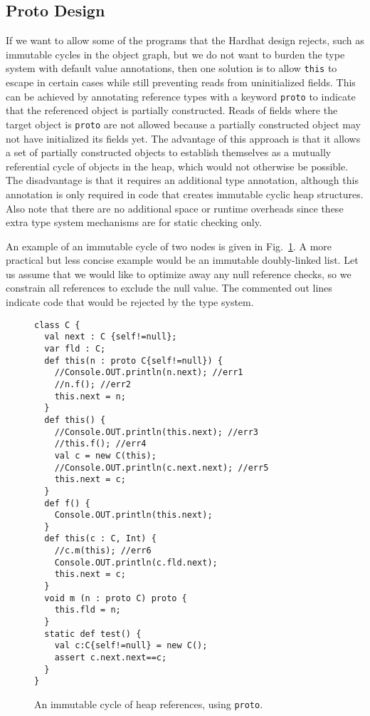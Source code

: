 \subsection{Proto Design}

If we want to allow some of the programs that the Hardhat design rejects, such
as immutable cycles in the object graph, but we do not want to burden the type
system with default value annotations, then one solution is to allow
\texttt{this} to escape in certain cases while still preventing reads from
uninitialized fields.  This can be achieved by annotating reference types with
a keyword \texttt{proto} to indicate that the referenced object is partially
constructed.  Reads of fields where the target object is \texttt{proto}
are not allowed because a partially constructed object may not have
initialized its fields yet.  The advantage of this approach is that it allows a set
of partially constructed objects to establish themselves as a mutually
referential cycle of objects in the heap, which would not otherwise be possible.
The disadvantage is that it requires an additional type annotation, although this
annotation is only required in code that creates immutable cyclic heap
structures.  Also note that there are no additional space or runtime overheads
since these extra type system mechanisms are for static checking only.

An example of an immutable cycle of two nodes is given in
Fig.~\ref{Figure:Cyclic}.  A more practical but less concise example would be an
immutable doubly-linked list.  Let us assume that we would like to optimize
away any null reference checks, so we constrain all references to exclude the
null value.  The commented out lines indicate code that would be rejected by
the type system.

\begin{figure}
\vspace{-0.2cm}\begin{lstlisting}
class C {
  val next : C {self!=null};
  var fld : C;
  def this(n : proto C{self!=null}) {
    //Console.OUT.println(n.next); //err1
    //n.f(); //err2
    this.next = n;
  }
  def this() {
    //Console.OUT.println(this.next); //err3
    //this.f(); //err4
    val c = new C(this);
    //Console.OUT.println(c.next.next); //err5
    this.next = c;
  }
  def f() {
    Console.OUT.println(this.next);
  }
  def this(c : C, Int) {
    //c.m(this); //err6
    Console.OUT.println(c.fld.next);
    this.next = c;
  }
  void m (n : proto C) proto {
    this.fld = n;
  }
  static def test() {
    val c:C{self!=null} = new C();
    assert c.next.next==c;
  }
}
\end{lstlisting}\vspace{-0.2cm}
\caption{An immutable cycle of heap references, using \texttt{proto}.}
\label{Figure:Cyclic}
\end{figure}

